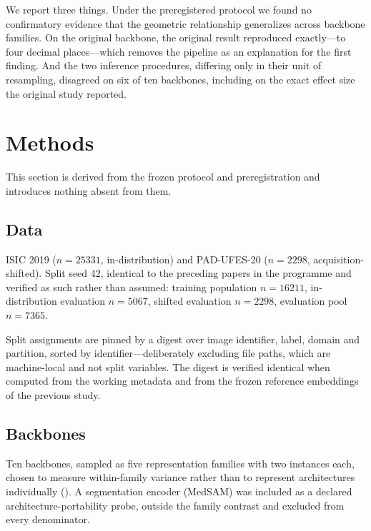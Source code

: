 \documentclass[11pt,a4paper]{article}
\begin{document}
We report three things. Under the preregistered protocol we found no confirmatory
evidence that the geometric relationship generalizes across backbone families. On
the original backbone, the original result reproduced exactly---to four decimal
places---which removes the pipeline as an explanation for the first finding. And
the two inference procedures, differing only in their unit of resampling,
disagreed on six of ten backbones, including on the exact effect size the
original study reported.

\section{Methods}

This section is derived from the frozen protocol and preregistration and
introduces nothing absent from them.

\subsection{Data}

ISIC 2019 ($n = \num{25331}$, in-distribution) and PAD-UFES-20 ($n = \num{2298}$,
acquisition-shifted). Split seed 42, identical to the preceding papers in the
programme and verified as such rather than assumed: training population
$n = \num{16211}$, in-distribution evaluation $n = \num{5067}$, shifted evaluation
$n = \num{2298}$, evaluation pool $n = \num{7365}$.

Split assignments are pinned by a digest over image identifier, label, domain and
partition, sorted by identifier---deliberately excluding file paths, which are
machine-local and not split variables. The digest is verified identical when
computed from the working metadata and from the frozen reference embeddings of
the previous study.

\subsection{Backbones}

Ten backbones, sampled as five representation families with two instances each,
chosen to measure within-family variance rather than to represent architectures
individually (). A segmentation encoder (MedSAM) was included
as a declared architecture-portability probe, outside the family contrast and
excluded from every denominator.
\end{document}

